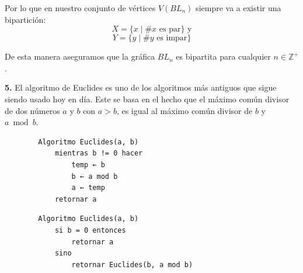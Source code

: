 \documentclass[12pt]{article}
\begin{document}
Por lo que en nuestro conjunto de vértices $V(BL_n)$ siempre va a existir una bipartición:
\[X = \{ x \mid \# x \text{ es par}\} \text{ y}\]
\[Y = \{ y \mid \# y \text{ es impar}\}\]

De esta manera aseguramos que la gráfica $BL_n$ es bipartita para cualquier $n \in \mathbb{Z^+}$.
\vspace{1cm}

%
%
\textbf{5.} El algoritmo de Euclides es uno de los algoritmos más antiguos que sigue siendo usado hoy en
día. Este se basa en el hecho que el máximo común divisor de dos números $a$ y $b$ con $a > b$, es igual
al máximo común divisor de $b$ y $a \bmod b$.\\

\begin{tcolorbox}[title=\textbf{Pseudocódigo del Algoritmo de Euclides (Iterativo)}, colback=gray!10!white, colframe=black!]
    \begin{verbatim}
        Algoritmo Euclides(a, b)
            mientras b != 0 hacer
                temp ← b
                b ← a mod b
                a ← temp
            retornar a
    \end{verbatim}
\end{tcolorbox}

\begin{tcolorbox}[title=\textbf{Pseudocódigo del Algoritmo de Euclides (Recursivo)}, colback=gray!10!white, colframe=black!]
    \begin{verbatim}
        Algoritmo Euclides(a, b)
            si b = 0 entonces
                retornar a
            sino
                retornar Euclides(b, a mod b)
    \end{verbatim}
\end{tcolorbox}
\end{document}
